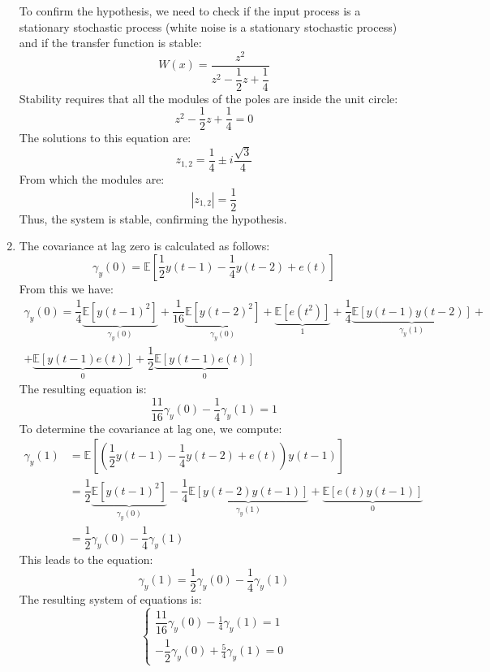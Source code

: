 \begin{enumerate}
        To confirm the hypothesis, we need to check if the input process is a stationary stochastic process (white noise is a stationary stochastic process) and if the transfer function is stable:
        \[W(x)=\dfrac{z^2}{z^2-\dfrac{1}{2}z+\dfrac{1}{4}}\]
        Stability requires that all the modules of the poles are inside the unit circle:
        \[z^2-\dfrac{1}{2}z+\dfrac{1}{4}=0\]
        The solutions to this equation are:
        \[z_{1,2}=\dfrac{1}{4}\pm i \dfrac{\sqrt{3}}{4}\] 
        From which the modules are:
        \[\left\lvert z_{1,2} \right\rvert =\dfrac{1}{2}\]
        Thus, the system is stable, confirming the hypothesis.
    \item The covariance at lag zero is calculated as follows:
        \[\gamma_y(0) = \mathbb{E}\left[\dfrac{1}{2}y(t-1)-\dfrac{1}{4}y(t-2)+e(t)\right]\]
        From this we have: 
        \begin{multline*}
            \gamma_y(0) = \dfrac{1}{4}\underbrace{\mathbb{E}\left[y(t-1)^2\right]}_{\gamma_y(0)} +\dfrac{1}{16}\underbrace{\mathbb{E}\left[y(t-2)^2\right]}_{\gamma_y(0)} +\underbrace{\mathbb{E}\left[e(t^2)\right]}_1 +\dfrac{1}{4}\underbrace{\mathbb{E}\left[y(t-1)y(t-2)\right]}_{\gamma_y(1)} + \\
            +\underbrace{\mathbb{E}\left[y(t-1)e(t)\right]}_0 + \dfrac{1}{2}\underbrace{\mathbb{E}\left[y(t-1)e(t)\right]}_0 
        \end{multline*}
        The resulting equation is:
        \[\dfrac{11}{16}\gamma_y(0)-\dfrac{1}{4}\gamma_y(1)=1\]
        To determine the covariance at lag one, we compute:
        \begin{align*}
            \gamma_y(1)     &= \mathbb{E}\left[\left(\dfrac{1}{2}y(t-1)-\dfrac{1}{4}y(t-2)+e(t)\right)y(t-1)\right] \\
                            &= \dfrac{1}{2}\underbrace{\mathbb{E}\left[y(t-1)^2\right]}_{\gamma_y(0)} -\dfrac{1}{4}\underbrace{\mathbb{E}\left[y(t-2)y(t-1)\right]}_{\gamma_y(1)} +\underbrace{\mathbb{E}\left[e(t)y(t-1)\right]}_0  \\
                            &= \dfrac{1}{2}\gamma_y(0) -\dfrac{1}{4}\gamma_y(1) 
        \end{align*}
        This leads to the equation:
        \[ \gamma_y(1)=\dfrac{1}{2}\gamma_y(0) -\dfrac{1}{4}\gamma_y(1)\]
        The resulting system of equations is:
        \[\begin{cases}
            \dfrac{11}{16}\gamma_y(0)-\frac{1}{4}\gamma_y(1)=1 \\ 
            -\dfrac{1}{2}\gamma_y(0)+\frac{5}{4}\gamma_y(1)=0

\end{cases}\]
\end{enumerate}
